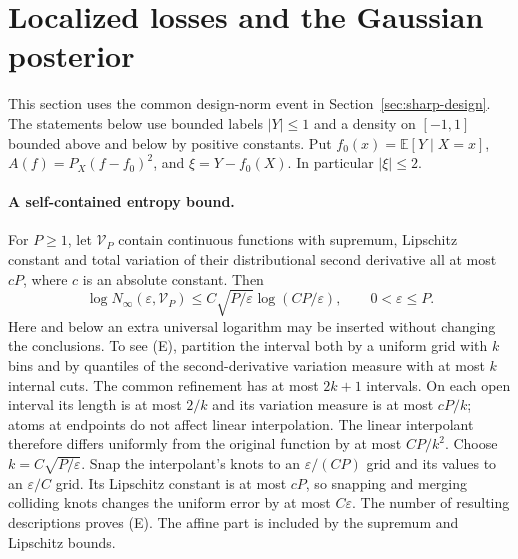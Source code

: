 \section{Localized losses and the Gaussian posterior}
\label{sec:localized-proof}
This section uses the common design-norm event in Section~\ref{sec:sharp-design}.
The statements below use bounded labels $|Y|\le1$ and a density on
$[-1,1]$ bounded above and below by positive constants. Put
$f_0(x)=\mathbb E[Y\mid X=x]$, $A(f)=P_X(f-f_0)^2$,
and $\xi=Y-f_0(X)$. In particular $|\xi|\le2$.

\paragraph{A self-contained entropy bound.}
For $P\ge1$, let $\mathcal V_P$ contain continuous functions with
supremum, Lipschitz constant and total variation of their distributional
second derivative all at most $cP$, where $c$ is an absolute constant.
Then
\[
 \log N_\infty(\varepsilon,\mathcal V_P)
 \le C\sqrt{P/\varepsilon}\log(CP/\varepsilon),
 \qquad 0<\varepsilon\le P. \tag{E}
\]
Here and below an extra universal logarithm may be inserted without
changing the conclusions. To see (E), partition the interval both by
a uniform grid with $k$ bins and by quantiles of the second-derivative
variation measure with at most $k$ internal cuts. The common
refinement has at most $2k+1$ intervals. On each open interval its
length is at most $2/k$ and its variation measure is at most $cP/k$;
atoms at endpoints do not affect linear interpolation. The linear
interpolant therefore differs uniformly from the original function
by at most $CP/k^2$. Choose $k=C\sqrt{P/\varepsilon}$.
Snap the interpolant's knots to an $\varepsilon/(CP)$ grid and
its values to an $\varepsilon/C$ grid. Its Lipschitz constant is
at most $cP$, so snapping and merging colliding knots changes the
uniform error by at most $C\varepsilon$. The number of resulting
descriptions proves (E). The affine part is included by the
supremum and Lipschitz bounds.

